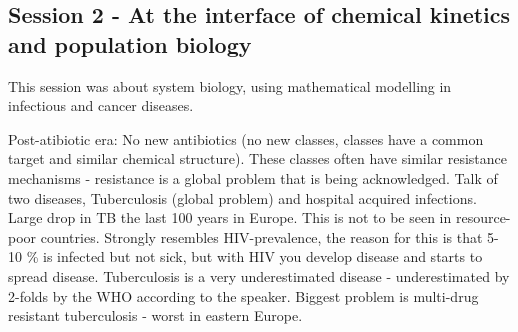 \documentclass[12p]{article}
\begin{document}
%
%
%
%


\subsection*{Session 2 - At the interface of chemical kinetics and population biology}

This session was about system biology, using mathematical modelling in infectious and cancer diseases.

Post-atibiotic era: No new antibiotics (no new classes, classes have a common target and similar chemical structure).
These classes often have similar resistance mechanisms - resistance is a global problem that is being acknowledged.
Talk of two diseases, Tuberculosis (global problem) and hospital acquired infections.
Large drop in TB the last 100 years in Europe.
This is not to be seen in resource-poor countries. 
Strongly resembles HIV-prevalence, the reason for this is that 5-10 \% is infected but not sick, but with HIV you develop disease and starts to spread disease.
Tuberculosis is a very underestimated disease - underestimated by 2-folds by the WHO according to the speaker.
Biggest problem is multi-drug resistant tuberculosis - worst in eastern Europe. 
\end{document}
